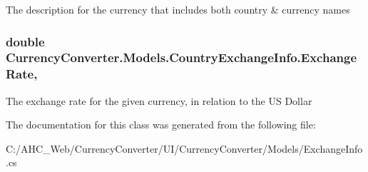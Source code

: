 The description for the currency that includes both country \& currency names 

\hypertarget{class_currency_converter_1_1_models_1_1_country_exchange_info_a6071faf123a293238228df9d98b0dd64}{
\subsubsection[{Exchange\-Rate}]{\setlength{\rightskip}{0pt plus 5cm}double Currency\-Converter.\-Models.\-Country\-Exchange\-Info.\-Exchange\-Rate\hspace{0.3cm}{\ttfamily [get]}, {\ttfamily [set]}}}\label{class_currency_converter_1_1_models_1_1_country_exchange_info_a6071faf123a293238228df9d98b0dd64}


The exchange rate for the given currency, in relation to the U\-S Dollar 



The documentation for this class was generated from the following file\-:\begin{DoxyCompactItemize}
\item 
C\-:/\-A\-H\-C\-\_\-\-Web/\-Currency\-Converter/\-U\-I/\-Currency\-Converter/\-Models/Exchange\-Info.\-cs\end{DoxyCompactItemize}
